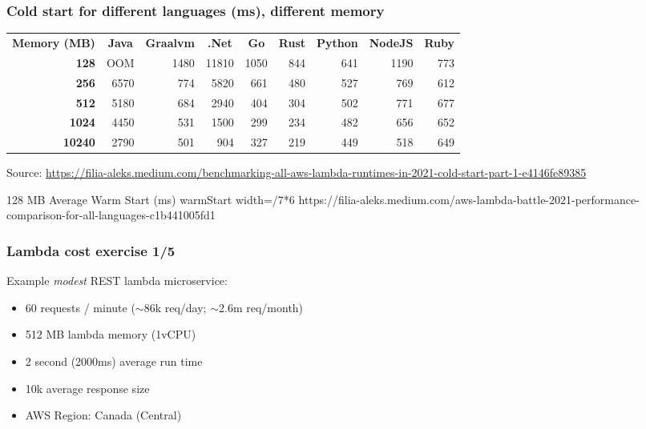 \documentclass[11pt,aspectratio=169]{beamer}
\begin{document}
\begin{nrcanFrame}
  \frametitle{Cold start for different languages (ms), different memory}
  \centering
  \begin{table}
    \begin{tabular}{rrrrrrrrr}
      \toprule 
      \bf Memory (MB)   &\multicolumn{1}{c}{\bf Java} &\multicolumn{1}{c}{\bf Graalvm} &\multicolumn{1}{c}{\bf .Net} &\multicolumn{1}{c}{\bf Go} &\multicolumn{1}{c}{\bf Rust} &\multicolumn{1}{c}{\bf Python} &\multicolumn{1}{c}{\bf NodeJS} &\multicolumn{1}{c}{\bf Ruby}\\ 
      \rowcolor{gray!50}
      \textbf{128} 	&OOM      &1480        &11810    &1050   &844       & 641      &1190       &773\\ 
      \textbf{256} 	&6570     &774         &5820     &661    &480       & 527      &769        &612\\ 
      \rowcolor{gray!50}
      \textbf{512} 	&5180     &684         &2940     &404    &304       & 502      &771        &677\\ 
      \textbf{1024} 	&4450     &531         &1500     &299    &234       & 482      &656        &652\\ 
      \rowcolor{gray!50}
      \textbf{10240}   & 2790    &501         &904      &327    & 219      &449       &518        &649\\ 
      \bottomrule
    \end{tabular}
  \end{table}

  {\tiny Source: \url{https://filia-aleks.medium.com/benchmarking-all-aws-lambda-runtimes-in-2021-cold-start-part-1-e4146fe89385}}
\end{nrcanFrame}



\nrcanGraphicFrame
  {128 MB Average Warm Start (ms)}
  {warmStart}
  {width=\paperwidth/7*6}
  {https://filia-aleks.medium.com/aws-lambda-battle-2021-performance-comparison-for-all-languages-c1b441005fd1}


\begin{nrcanFrame}
  \frametitle{Lambda cost exercise 1/5}
  Example \textit{modest} REST lambda microservice:
  \begin{itemize}
  \item 60 requests / minute ($\sim$86k req/day; $\sim$2.6m req/month)
  \item 512 MB lambda memory (1vCPU)
  \item 2 second (2000ms) average run time
  \item 10k average response size
  \item AWS Region: Canada (Central)
  \end{itemize}
\end{nrcanFrame}
\end{document}
